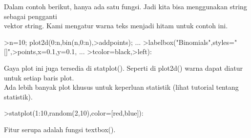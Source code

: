 \documentclass[a4paper,10pt]{article}
\begin{document}
\begin{eulernotebook}
\begin{eulercomment}
\begin{eulercomment}
\begin{eulercomment}
\begin{eulercomment}
\begin{eulercomment}
\begin{eulercomment}
\begin{eulercomment}
Dalam contoh berikut, hanya ada satu fungsi. Jadi kita bisa
menggunakan string sebagai pengganti\\
vektor string. Kami mengatur warna teks menjadi hitam untuk contoh
ini.
\end{eulercomment}
\begin{eulerprompt}
>n=10; plot2d(0:n,bin(n,0:n),>addpoints); ...
>labelbox("Binomials",styles="[]",>points,x=0.1,y=0.1, ...
>tcolor=black,>left):
\end{eulerprompt}
\begin{eulercomment}
Gaya plot ini juga tersedia di statplot(). Seperti di plot2d() warna
dapat diatur untuk setiap baris plot.\\
Ada lebih banyak plot khusus untuk keperluan statistik (lihat tutorial
tentang statistik).
\end{eulercomment}
\begin{eulerprompt}
>statplot(1:10,random(2,10),color=[red,blue]):
\end{eulerprompt}
\begin{eulercomment}
Fitur serupa adalah fungsi textbox().


\end{eulercomment}
\end{eulercomment}
\end{eulercomment}
\end{eulercomment}
\end{eulercomment}
\end{eulercomment}
\end{eulercomment}
\end{eulernotebook}
\end{document}
